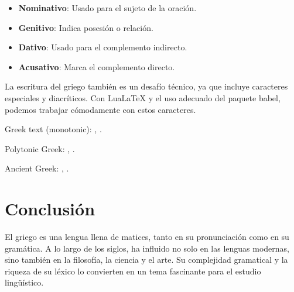 \begin{itemize}
\item \textbf{Nominativo}: Usado para el sujeto de la oración.
\item \textbf{Genitivo}: Indica posesión o relación.
\item \textbf{Dativo}: Usado para el complemento indirecto.
\item \textbf{Acusativo}: Marca el complemento directo.
\end{itemize}

La escritura del griego también es un desafío técnico, ya que incluye caracteres especiales y diacríticos. Con LuaLaTeX y el uso adecuado del paquete babel, podemos trabajar cómodamente con estos caracteres.


Greek text (monotonic): \figurename, \alsoname.


Polytonic Greek: \figurename, \alsoname.


Ancient Greek: \figurename, \alsoname.


\section{Conclusión}

El griego es una lengua llena de matices, tanto en su pronunciación como en su gramática. A lo largo de los siglos, ha influido no solo en las lenguas modernas, sino también en la filosofía, la ciencia y el arte. Su complejidad gramatical y la riqueza de su léxico lo convierten en un tema fascinante para el estudio lingüístico.

